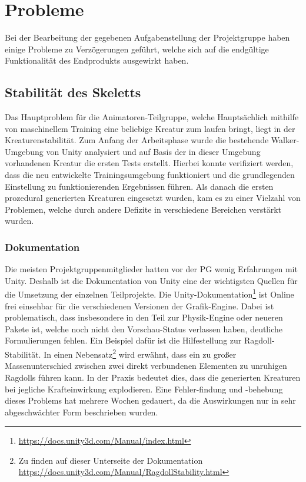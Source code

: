 \section{Probleme}
Bei der Bearbeitung der gegebenen Aufgabenstellung der Projektgruppe haben einige Probleme zu Verzögerungen geführt, welche sich auf die endgültige Funktionalität des Endprodukts ausgewirkt haben.

\subsection{Stabilität des Skeletts}
Das Hauptproblem für die Animatoren-Teilgruppe, welche Hauptsächlich mithilfe von maschinellem Training eine beliebige Kreatur zum laufen bringt, liegt in der Kreaturenstabilität. Zum Anfang der Arbeitsphase wurde die bestehende Walker-Umgebung von Unity analysiert und auf Basis der in dieser Umgebung vorhandenen Kreatur die ersten Tests erstellt. Hierbei konnte verifiziert werden, dass die neu entwickelte Trainingsumgebung funktioniert und die grundlegenden Einstellung zu funktionierenden Ergebnissen führen. Als danach die ersten prozedural generierten Kreaturen eingesetzt wurden, kam es zu einer Vielzahl von Problemen, welche durch andere Defizite in verschiedene Bereichen verstärkt wurden.

\subsubsection{Dokumentation} %
Die meisten Projektgruppenmitglieder hatten vor der PG wenig Erfahrungen mit Unity. Deshalb ist die Dokumentation von Unity eine der wichtigsten Quellen für die Umsetzung der einzelnen Teilprojekte. Die Unity-Dokumentation\footnote{\url{https://docs.unity3d.com/Manual/index.html}} ist Online frei einsehbar für die verschiedenen Versionen der Grafik-Engine. Dabei ist problematisch, dass insbesondere in den Teil zur Physik-Engine oder neueren Pakete ist, welche noch nicht den Vorschau-Status verlassen haben, deutliche Formulierungen fehlen. Ein Beispiel dafür ist die Hilfestellung zur Ragdoll-Stabilität. In einen Nebensatz\footnote{Zu finden auf dieser Unterseite der Dokumentation \url{https://docs.unity3d.com/Manual/RagdollStability.html}} wird erwähnt, dass ein zu großer Massenunterschied zwischen zwei direkt verbundenen Elementen zu unruhigen Ragdolls führen kann. In der Praxis bedeutet dies, dass die generierten Kreaturen bei jegliche Krafteinwirkung explodieren. Eine Fehler-findung und -behebung dieses Problems hat mehrere Wochen gedauert, da die Auswirkungen nur in sehr abgeschwächter Form beschrieben wurden.

